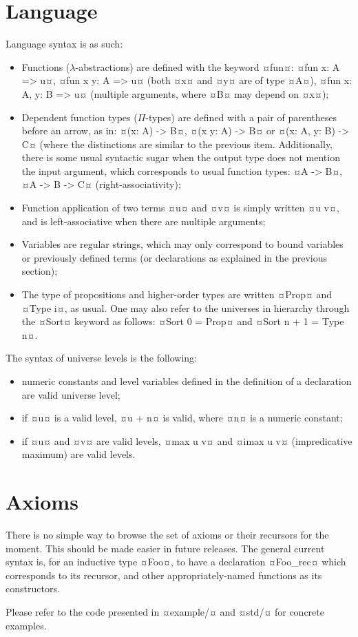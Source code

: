\documentclass[twocolumn]{article}
\begin{document}
\section{Language}
Language syntax is as such:
\begin{itemize}
	\item Functions (\(\lambda\)-abstractions) are defined with the keyword ¤fun¤:
	      ¤fun x: A => u¤, ¤fun x y: A => u¤ (both ¤x¤ and ¤y¤ are of type ¤A¤),
	      ¤fun x: A, y: B => u¤ (multiple arguments, where ¤B¤ may depend on ¤x¤);

	\item Dependent function types (\(\Pi\)-types) are defined with a pair of parentheses
	      before an arrow, as in: ¤(x: A) -> B¤, ¤(x y: A) -> B¤ or
	      ¤(x: A, y: B) -> C¤ (where the distinctions are similar to the previous
	      item. Additionally, there is some usual syntactic sugar when the output
	      type does not mention the input argument, which corresponds to usual
	      function types: ¤A -> B¤, ¤A -> B -> C¤ (right-associativity);

	\item Function application of two terms ¤u¤ and ¤v¤ is simply written ¤u v¤,
	      and is left-associative when there are multiple arguments;

	\item Variables are regular strings, which may only correspond to bound
	      variables or previously defined terms (or declarations as explained in the
	      previous section);

	\item The type of propositions and higher-order types are written ¤Prop¤ and
	      ¤Type i¤, as usual. One may also refer to the universes in hierarchy through
	      the ¤Sort¤ keyword as follows: ¤Sort 0 = Prop¤ and ¤Sort n + 1 = Type n¤.
\end{itemize}

The syntax of universe levels is the following:
\begin{itemize}
	\item numeric constants and level variables defined in the definition of a
	      declaration are valid universe level;
	\item if ¤u¤ is a valid level, ¤u + n¤ is valid, where ¤n¤ is a numeric
	      constant;
	\item if ¤u¤ and ¤v¤ are valid levels, ¤max u v¤ and ¤imax u v¤ (impredicative
	      maximum) are valid levels.
\end{itemize}

\section{Axioms}
There is no simple way to browse the set of axioms or their recursors for the
moment. This should be made easier in future releases. The general current
syntax is, for an inductive type ¤Foo¤, to have a declaration ¤Foo_rec¤ which
corresponds to its recursor, and other appropriately-named functions as its
constructors.

Please refer to the code presented in ¤example/¤ and ¤std/¤ for concrete
examples.
\end{document}
